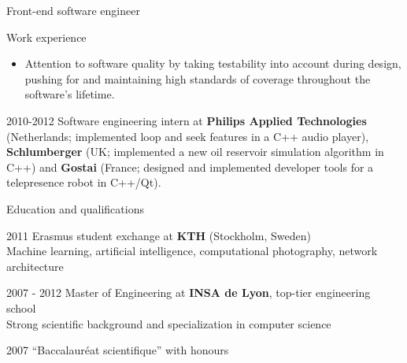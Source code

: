 \documentclass{article}
\begin{document}
\begin{cv}{Front-end software engineer}
\begin{cvlist}{Work experience}
\begin{itemize}
      \item Attention to software quality by taking testability into account during
      design, pushing for and maintaining high standards of coverage throughout
      the software's lifetime.
      \end{itemize}

    \item[2010-2012] Software engineering intern at \textbf{Philips Applied
      Technologies} (Netherlands; implemented loop and seek features in a C++ audio player), \textbf{Schlumberger} (UK; implemented a new oil reservoir simulation algorithm in C++) and
      \textbf{Gostai} (France; designed and implemented developer tools for a telepresence robot in C++/Qt).




\end{cvlist}


\begin{cvlist}{Education and qualifications}
    \item[2011] Erasmus student exchange at \textbf{KTH} (Stockholm, Sweden)\\
    Machine learning, artificial intelligence, computational photography,
      network architecture

    \item[2007 - 2012] Master of Engineering at \textbf{INSA de Lyon}, top-tier
    engineering school\\
    Strong scientific background and specialization in computer science

    \item[2007] ``Baccalauréat scientifique'' with honours
\end{cvlist}



\end{cv}
\end{document}
